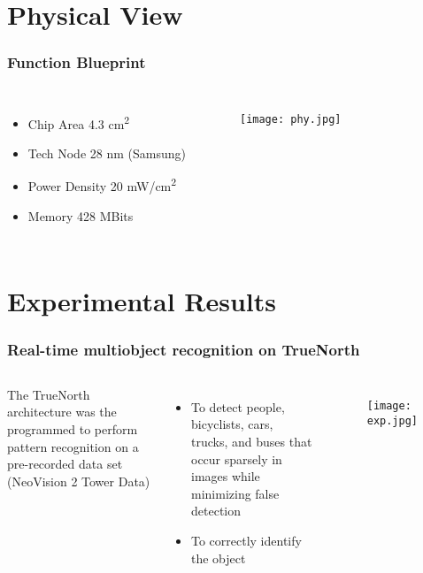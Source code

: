 \documentclass{beamer}
\begin{document}
\section{Physical View}


\begin{frame}
\frametitle{Function Blueprint}
\begin{columns}[c]
	\begin{itemize}
		\item Chip Area 4.3 cm\textsuperscript{2}
		\item Tech Node 28 nm (Samsung)
		\item Power Density 20 mW/cm\textsuperscript{2} 
		\item Memory 428 MBits
	\end{itemize}

	\begin{figure}
	\texttt{[image: phy.jpg]}
	\end{figure}

\end{columns}

\end{frame}


\section{Experimental Results}
\begin{frame}
\frametitle{Real-time multiobject recognition on TrueNorth}
\begin{columns}[c]
The TrueNorth architecture was the programmed to perform pattern recognition on a pre-recorded data set (NeoVision 2 Tower Data)
\begin{itemize}
\item To detect people, bicyclists, cars, trucks, and buses that occur sparsely in images while minimizing false detection
\item To correctly identify the object
\end{itemize}

\begin{figure}
\texttt{[image: exp.jpg]}
\end{figure}

\end{columns}
\end{frame}
\end{document}
